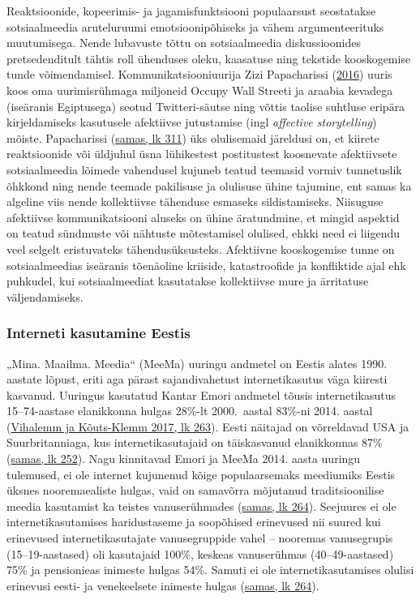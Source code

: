 \documentclass[estonian,]{article}
\begin{document}
Reaktsioonide, kopeerimis- ja jagamisfunktsiooni populaarsust seostatakse sotsiaalmeedia aruteluruumi emotsioonipõhiseks ja vähem argumenteerituks muutumisega. Nende lubavuste tõttu on sotsiaalmeedia diskussioonides pretsedenditult tähtis roll ühenduses oleku, kaasatuse ning tekstide kooskogemise tunde võimendamisel. Kommunikatsiooniuurija Zizi Papacharissi (\protect\hyperlink{Papacharissi2016}{2016}) uuris koos oma uurimisrühmaga miljoneid Occupy Wall Streeti ja araabia kevadega (iseäranis Egiptusega) seotud Twitteri-säutse ning võttis taolise suhtluse eripära kirjeldamiseks kasutusele afektiivse jutustamise (ingl \emph{affective storytelling}) mõiste. Papacharissi (\protect\hyperlink{Papacharissi2016}{samas, lk 311}) üks olulisemaid järeldusi on, et kiirete reaktsioonide või üldjuhul üsna lühikestest postitustest koosnevate afektiivsete sotsiaalmeedia lõimede vahendusel kujuneb teatud teemasid vormiv tunnetuslik õhkkond ning nende teemade pakilisuse ja olulisuse ühine tajumine, ent samas ka algeline viis nende kollektiivse tähenduse esmaseks sildistamiseks. Niisuguse afektiivse kommunikatsiooni aluseks on ühine äratundmine, et mingid aspektid on teatud sündmuste või nähtuste mõtestamisel olulised, ehkki need ei liigendu veel selgelt eristuvateks tähendusüksusteks. Afektiivne kooskogemise tunne on sotsiaalmeedias iseäranis tõenäoline kriiside, katastroofide ja konfliktide ajal ehk puhkudel, kui sotsiaalmeediat kasutatakse kollektiivse mure ja ärritatuse väljendamiseks.

\hypertarget{interneti-kasutamine-eestis}{%
\subsubsection*{Interneti kasutamine Eestis}\label{interneti-kasutamine-eestis}}

„Mina. Maailma. Meedia`` (MeeMa) uuringu andmetel on Eestis alates 1990. aastate lõpust, eriti aga pärast sajandivahetust internetikasutus väga kiiresti kasvanud. Uuringus kasutatud Kantar Emori andmetel tõusis internetikasutus 15--74-aastase elanikkonna hulgas 28\%-lt 2000.~aastal 83\%-ni 2014. aastal (\protect\hyperlink{Vihalemm2017}{Vihalemm ja Kõuts-Klemm 2017, lk 263}). Eesti näitajad on võrreldavad USA ja Suurbritanniaga, kus internetikasutajaid on täiskasvanud elanikkonnas 87\% (\protect\hyperlink{Vihalemm2017}{samas, lk 252}). Nagu kinnitavad Emori ja MeeMa 2014. aasta uuringu tulemused, ei ole internet kujunenud kõige populaarsemaks meediumiks Eestis üksnes nooremaealiste hulgas, vaid on samavõrra mõjutanud traditsioonilise meedia kasutamist ka teistes vanuserühmades (\protect\hyperlink{Vihalemm2017}{samas, lk 264}). Seejuures ei ole internetikasutamises haridustaseme ja soopõhised erinevused nii suured kui erinevused internetikasutajate vanusegruppide vahel -- nooremas vanusegrupis (15--19-aastased) oli kasutajaid 100\%, keskeas vanuserühmas (40--49-aastased) 75\% ja pensionieas inimeste hulgas 54\%. Samuti ei ole internetikasutamises olulisi erinevusi eesti- ja venekeelsete inimeste hulgas (\protect\hyperlink{Vihalemm2017}{samas, lk 264}).
\end{document}
